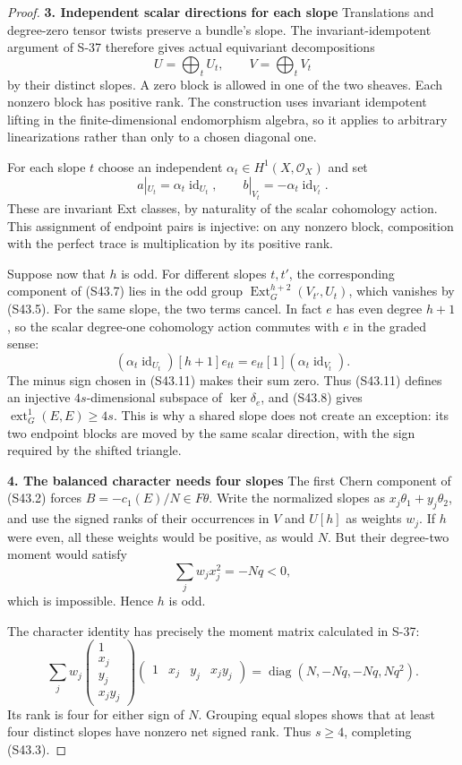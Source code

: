\begin{proof}
\par\medskip\noindent\textbf{3. Independent scalar directions for each slope}\quad
Translations and degree-zero tensor twists preserve a bundle's
slope. The invariant-idempotent argument of S-37 therefore
gives actual equivariant decompositions
\[
 U=\bigoplus_t U_t,\qquad V=\bigoplus_t V_t
 \tag{S43.10}
\]
by their distinct slopes. A zero block is allowed in one of the
two sheaves. Each nonzero block has positive rank.
The construction uses invariant idempotent lifting in the
finite-dimensional endomorphism algebra, so it applies to
arbitrary linearizations rather than only to a chosen diagonal one.

For each slope $t$ choose an independent
$\alpha_t\in H^1(X,\mathcal O_X)$ and set
\[
 a|_{U_t}=\alpha_t\operatorname{id}_{U_t},\qquad
 b|_{V_t}=-\alpha_t\operatorname{id}_{V_t}.
 \tag{S43.11}
\]
These are invariant Ext classes, by naturality of the scalar
cohomology action. This assignment of endpoint pairs is
injective: on any nonzero block, composition with the perfect
trace is multiplication by its positive rank.

Suppose now that $h$ is odd. For different slopes $t,t'$,
the corresponding component of (S43.7) lies in the odd group
$\operatorname{Ext}^{h+2}_G(V_{t'},U_t)$, which vanishes by
(S43.5). For the same slope, the two terms cancel.
In fact $e$ has even degree $h+1$, so the scalar degree-one
cohomology action commutes with $e$ in the graded sense:
\[
 (\alpha_t\operatorname{id}_{U_t})[h+1]e_{tt}
       =e_{tt}[1](\alpha_t\operatorname{id}_{V_t}).
\]
The minus sign chosen in (S43.11) makes their sum zero.
Thus (S43.11) defines an injective $4s$-dimensional subspace
of $\ker\delta_e$, and (S43.8) gives
$\operatorname{ext}^1_G(E,E)\ge4s$.
This is why a shared slope does not create an exception: its
two endpoint blocks are moved by the same scalar direction,
with the sign required by the shifted triangle.

\par\medskip\noindent\textbf{4. The balanced character needs four slopes}\quad
The first Chern component of (S43.2) forces
$B=-c_1(E)/N\in F\theta$. Write the normalized slopes as
$x_j\theta_1+y_j\theta_2$, and use the signed ranks
of their occurrences in $V$ and $U[h]$ as weights $w_j$.
If $h$ were even, all these weights would be positive,
as would $N$. But their degree-two moment would satisfy
\[
 \sum_j w_jx_j^2=-Nq<0,
\]
which is impossible. Hence $h$ is odd.

The character identity has precisely the moment matrix
calculated in S-37:
\[
 \sum_j w_j
  \begin{pmatrix}1\\x_j\\y_j\\x_jy_j\end{pmatrix}
  \begin{pmatrix}1&x_j&y_j&x_jy_j\end{pmatrix}
     =\operatorname{diag}(N,-Nq,-Nq,Nq^2).
 \tag{S43.12}
\]
Its rank is four for either sign of $N$. Grouping equal
slopes shows that at least four distinct slopes have nonzero
net signed rank. Thus $s\ge4$, completing (S43.3).


\end{proof}

